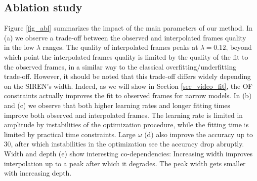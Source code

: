 \documentclass{article}
\begin{document}
\subsection{Ablation study}
\label{sec_abl}

Figure \ref{fig_abl} summarizes the impact of the main parameters of our method.
In (a) we observe a trade-off between the observed and interpolated frames quality in the low $\lambda$ ranges.
The quality of interpolated frames peaks at $\lambda=0.12$, beyond which point the interpolated frames quality is limited
by the quality of the fit to the observed frames, in a similar way to the classical overfitting/underfitting trade-off.
However, it should be noted that this trade-off differs widely depending on the SIREN's width.
Indeed, as we will show in Section \ref{sec_video_fit},
the OF constraints actually improves the fit to observed frames for narrow models.
In (b) and (c) we observe that both higher learning rates and longer fitting times
improve both observed and interpolated frames.
The learning rate is limited in amplitude by instabilities of the optimization procedure,
while the fitting time is limited by practical time constraints.
Large $\omega$ (d) also improve the accuracy up to 30,
after which instabilities in the optimization see the accuracy drop abruptly.
Width and depth (e) show interesting co-dependencies:
Increasing width improves interpolation up to a peak after which it degrades.
The peak width gets smaller with increasing depth.
\end{document}
